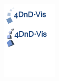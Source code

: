 {\begin{minipage}{11.89cm}
\begin{flushright}
		\end{flushright}
	\end{minipage}
	\begin{minipage}{11.3cm}
		\begin{flushright}
			\includegraphics[height=4cm]{./resources/4DnD-Logo.pdf}
		\end{flushright}
	\end{minipage}
}


